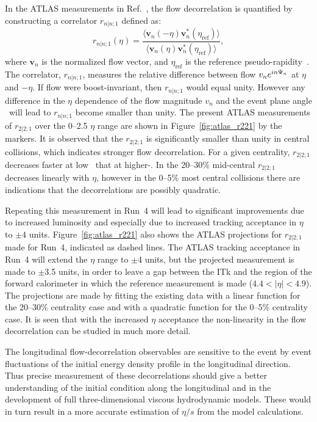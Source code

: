 In the ATLAS measurements in Ref.~\cite{HION-2016-04}, the flow decorrelation 
  is quantified by constructing a correlator $r_{n|n;1}$ defined as:
\begin{equation}
r_{n|n;1}(\eta)=%
  \frac{\langle \mathbf{v}_n(-\eta)\mathbf{v}_n^*(\eta_{\mathrm{ref}})\rangle}%
  {\langle \mathbf{v}_n(\eta)\mathbf{v}_n^*(\eta_{\mathrm{ref}})\rangle},
\end{equation}
where $\mathbf{v}_n$ is the normalized flow vector, and $\eta_{\mathrm{ref}}$ is 
  the reference pseudo-rapidity~\cite{HION-2016-04}.
The correlator,  $r_{n|n;1}$,  measures the relative difference between flow
  $v_ne^{in\Psi_{n}}$ at $\eta$ and $-\eta$.
If flow were boost-invariant, then $r_{n|n;1}$ would equal unity.
However any  difference in the $\eta$ dependence of the flow magnitude
  $v_n$ and the event plane angle \psin\ will lead to $r_{n|n;1}$
  become smaller than unity.
The present ATLAS measurements of $r_{2|2;1}$ over the 0--2.5 $\eta$ range 
  are shown in Figure~\ref{fig:atlas_r221} by the markers. 
It is observed that the $r_{2|2;1}$ is significantly smaller than unity 
  in central collisions, which indicates stronger flow decorrelation.
For a given centrality, $r_{2|2;1}$ decreases faster at low \pt\ 
  that at higher-\pt.
In the 20--30\% mid-central $r_{2|2;1}$ decreases linearly with $\eta$, 
  however in the 0--5\% most central collisions there are indications
  that the decorrelations are possibly quadratic.

Repeating this measurement in Run~4 will lead to significant improvements 
  due to increased luminosity and especially due to increased tracking 
  acceptance in $\eta$ to $\pm4$ units.
Figure~\ref{fig:atlas_r221} also shows the ATLAS projections for 
  $r_{2|2;1}$ made for Run~4, indicated as dashed lines.
The ATLAS tracking acceptance in Run~4 will extend the $\eta$ range 
  to $\pm$4 units, but the projected measurement is made
  to $\pm$3.5 units, in order to leave a gap between the ITk and the 
  region of the forward calorimeter in which the reference measurement 
  is made ($4.4<|\eta|<4.9$).
The projections are made by fitting the existing data with a linear 
  function for the 20--30\% centrality case and with a quadratic 
  function for the 0--5\% centrality case.
It is seen that with the increased $\eta$ acceptance the non-linearity 
  in the flow decorrelation can be studied in much more detail.


The longitudinal flow-decorrelation observables are sensitive to the 
  event by event fluctuations of the initial energy density profile 
  in the longitudinal direction. 
Thus precise measurement of these decorrelations should give
  a better understanding of the initial condition along the 
  longitudinal and in the development of full three-dimensional 
  viscous hydrodynamic models.
These would in turn result in a more accurate estimation of 
  $\eta/s$ from the model calculations.




